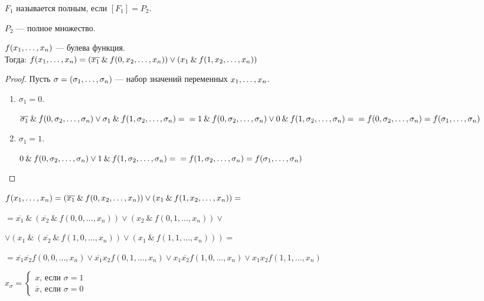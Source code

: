 \begin{definition}
	$F_1$ называется полным, если $[F_1] = P_2$.
\end{definition}

\begin{example}
	$P_2$ --- полное множество.
\end{example}

\begin{statement}
	$f(x_1, \ldots, x_n)$ --- булева функция. \\Тогда: $f(x_1, \ldots, x_n) = (\overline{x_1} \: \& \: f(0, x_2, \ldots, x_n)) \vee (x_1 \: \& \: f(1, x_2, \ldots , x_n))$
\end{statement}
\begin{proof}
	Пусть $\sigma = (\sigma_1, \ldots, \sigma_n) $ --- набор значений переменных $x_1, \ldots, x_n$.
\begin{enumerate}
\item $\sigma_1 = 0$. 

$\overline{\sigma_1} \: \& \: f(0, \sigma_2, \ldots, \sigma_n) \vee \sigma_1 \: \& \: f(1, \sigma_2, \ldots, \sigma_n) =\\ = 1 \: \& \: f(0, \sigma_2, \ldots, \sigma_n) \vee 0 \: \& \: f(1, \sigma_2, \ldots, \sigma_n) =\\ = f(0, \sigma_2, \ldots, \sigma_n) = f(\sigma_1, \ldots, \sigma_n) $

\item $\sigma_1 = 1$.

$0 \: \& \: f(0, \sigma_2, \ldots, \sigma_n) \vee 1 \: \& \: f(1, \sigma_2, \ldots, \sigma_n) =\\ = f(1, \sigma_2, \ldots, \sigma_n) = f(\sigma_1, \ldots, \sigma_n) $
\end{enumerate}
\end{proof}

$
f(x_1, \ldots, x_n) = (\overline{x_1} \: \& \: f(0, x_2, \ldots, x_n)) \vee (x_1 \: \& \: f(1, x_2, \ldots , x_n)) = $

$= \overline{x_1} \: \& \: (\overline{x_2} \: \& \: f(0, 0, \ldots, x_n)) \vee (x_2 \: \& \: f(0, 1, \ldots , x_n)) \vee $

$ \vee (x_1 \: \& \: (\overline{x_2} \: \& \: f(1, 0, \ldots, x_n)) \vee (x_1 \: \& \: f(1, 1, \ldots , x_n))) =$

$
= \overline{x_1}\overline{x_2}f(0, 0, \ldots, x_n) \vee \overline{x_1} x_2 f(0, 1, \ldots, x_n) \vee x_1 \overline{x_2}f(1, 0, \ldots, x_n) \vee x_1 x_2 f(1, 1, \ldots, x_n)
$

\begin{definition}
	$x_\sigma = \begin{cases} x \text{, если }\sigma = 1 \\ \overline{x} \text{, если }\sigma = 0 \end{cases}$
\end{definition}


